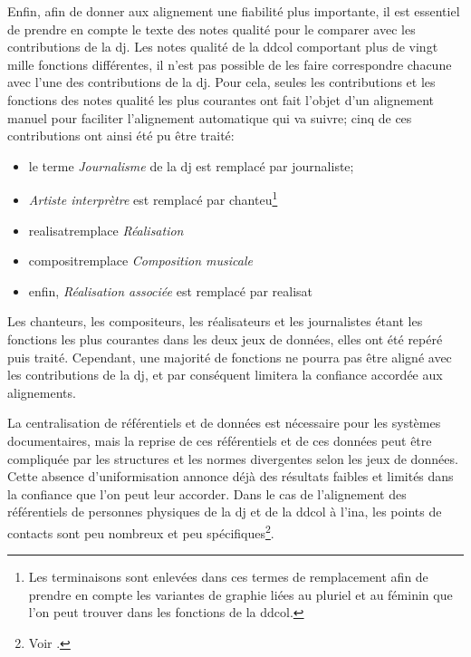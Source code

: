 Enfin, afin de donner aux alignement une fiabilité plus importante, il est essentiel de prendre en compte le texte des notes qualité pour le comparer avec les contributions de la \ac{dj}. Les notes qualité de la \ac{ddcol} comportant plus de vingt mille fonctions différentes, il n'est pas possible de les faire correspondre chacune avec l'une des contributions de la \ac{dj}. Pour cela, seules les contributions et les fonctions des notes qualité les plus courantes ont fait l'objet d'un alignement manuel pour faciliter l'alignement automatique qui va suivre; cinq de ces contributions ont ainsi été pu être traité:
\begin{itemize}
	\item le terme \textit{Journalisme} de la \ac{dj} est remplacé par \og journaliste\fg{};
	\item \textit{Artiste interprètre} est remplacé par \og chanteu\fg{}\footnote{Les terminaisons sont enlevées dans ces termes de remplacement afin de prendre en compte les variantes de graphie liées au pluriel et au féminin que l'on peut trouver dans les fonctions de la \ac{ddcol}.}
	\item \og realisat\fg remplace \textit{Réalisation}
	\item \og composit\fg remplace \textit{Composition musicale}
	\item enfin, \textit{Réalisation associée} est remplacé par \og realisat\fg{}
\end{itemize}
\medskip
Les chanteurs, les compositeurs, les réalisateurs et les journalistes étant les fonctions les plus courantes dans les deux jeux de données, elles ont été repéré puis traité. Cependant, une majorité de fonctions ne pourra pas être aligné avec les contributions de la \ac{dj}, et par conséquent limitera la confiance accordée aux alignements.


\bigskip
\bigskip
La centralisation de référentiels et de données est nécessaire pour les systèmes documentaires, mais la reprise de ces référentiels et de ces données peut être compliquée par les structures et les normes divergentes selon les jeux de données. Cette absence d'uniformisation annonce déjà des résultats faibles et limités dans la confiance que l'on peut leur accorder. Dans le cas de l'alignement des référentiels de personnes physiques de la \ac{dj} et de la \ac{ddcol} à l'\ac{ina}, les points de contacts sont peu nombreux et peu spécifiques\footnote{Voir .}.

